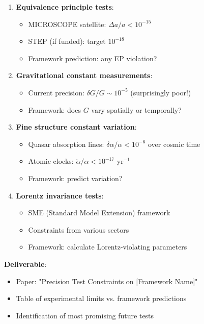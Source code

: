 \begin{enumerate}
    \item \textbf{Equivalence principle tests}:
    \begin{itemize}
        \item MICROSCOPE satellite: $\Delta a/a < 10^{-15}$
        \item STEP (if funded): target $10^{-18}$
        \item Framework prediction: any EP violation?
    \end{itemize}

    \item \textbf{Gravitational constant measurements}:
    \begin{itemize}
        \item Current precision: $\delta G/G \sim 10^{-5}$ (surprisingly poor!)
        \item Framework: does $G$ vary spatially or temporally?
    \end{itemize}

    \item \textbf{Fine structure constant variation}:
    \begin{itemize}
        \item Quasar absorption lines: $\delta\alpha/\alpha < 10^{-6}$ over cosmic time
        \item Atomic clocks: $\dot{\alpha}/\alpha < 10^{-17}$ yr$^{-1}$
        \item Framework: predict variation?
    \end{itemize}

    \item \textbf{Lorentz invariance tests}:
    \begin{itemize}
        \item SME (Standard Model Extension) framework
        \item Constraints from various sectors
        \item Framework: calculate Lorentz-violating parameters
    \end{itemize}
\end{enumerate}

\textbf{Deliverable}:
\begin{itemize}
    \item Paper: "Precision Test Constraints on [Framework Name]"
    \item Table of experimental limits vs. framework predictions
    \item Identification of most promising future tests
\end{itemize}

